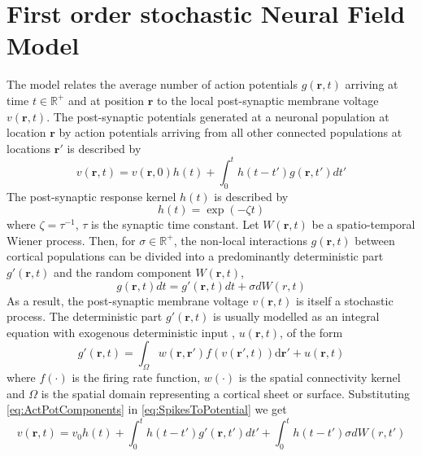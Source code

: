 \documentclass[a4paper,10pt]{article}
\begin{document}
\section{First order stochastic Neural Field Model}
The model relates the average number of action potentials $g(\mathbf{r},t)$ arriving at time $t \in \mathbb R^{+}$ and at position $\mathbf{r}$ to the local post-synaptic membrane voltage $v(\mathbf{r},t)$. The post-synaptic potentials generated at a neuronal population at location $\mathbf{r}$ by action potentials arriving from all other connected populations at locations $\mathbf{r}'$ is described by 
\begin{equation}
	\label{eq:SpikesToPotential} v\left( {\mathbf{r},t} \right)=v(\mathbf r, 0)h(t)+\int_0^t {h\left( {t - t'} \right)g\left( {\mathbf{r},t'} \right)dt'} 
\end{equation}
The post-synaptic response kernel $h(t)$ is described by 
\begin{equation}
	\label{eq:SynapticRespKernel} h(t) = \exp{\left(-\zeta t\right)} 
\end{equation}
where $\zeta=\tau^{-1}$, $\tau$ is the synaptic time constant.
Let $W(\mathbf r,t)$ be a spatio-temporal Wiener process. Then, for $\sigma \in \mathbb R^{+}$, the non-local interactions $g\left( {\mathbf{r},t} \right)$ between cortical populations can be divided into a predominantly deterministic part $g'\left( {\mathbf{r},t} \right) $ and  the random component $W(\mathbf r,t)$,
\begin{equation}\label{eq:ActPotComponents}
  g\left( {\mathbf{r},t} \right)dt=g'\left( {\mathbf{r},t} \right)dt+\sigma d W(r,t)
\end{equation}
As a result, the post-synaptic membrane voltage $v(\mathbf r, t)$ is itself a stochastic process. The deterministic part $g'(\mathbf r, t)$ is usually modelled as an integral equation with exogenous deterministic input , $ u(\mathbf r,t)$, of the form \cite{Atay2005}
\begin{equation}
	\label{DeterministicRateBasedInteractions} g'\left( \mathbf{r},t \right) = \int_\Omega {w\left( \mathbf{r},\mathbf{r}' \right)f\left( v\left( \mathbf{r}',t \right) \right)\textrm{d}\mathbf{r}'}+u(\mathbf r,t)
\end{equation}
where $f(\cdot)$ is the firing rate function, $w(\cdot)$ is the spatial connectivity kernel and $\Omega$ is the spatial domain representing a cortical sheet or surface. Substituting \eqref{eq:ActPotComponents} in \eqref{eq:SpikesToPotential} we get
\begin{equation}\label{eq:NeuralModelDeterStoch}
v\left( {\mathbf{r},t} \right)=v_0h(t)+\int_0^t {h\left( {t - t'} \right)g'\left( {\mathbf{r},t'} \right)dt'}+ \int_0^t h\left( {t - t'} \right)\sigma d W(r,t')
\end{equation}
\end{document}
